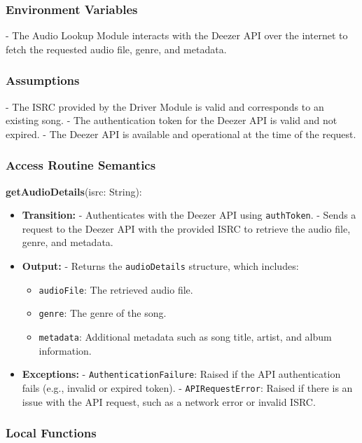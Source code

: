 \documentclass[12pt, titlepage]{article}
\begin{document}
\subsubsection{Environment Variables}
- The Audio Lookup Module interacts with the Deezer API over the internet to fetch the requested audio file, genre, and metadata.

\subsubsection{Assumptions}
- The ISRC provided by the Driver Module is valid and corresponds to an existing song.
- The authentication token for the Deezer API is valid and not expired.
- The Deezer API is available and operational at the time of the request.

\subsubsection{Access Routine Semantics}

\noindent \textbf{getAudioDetails}(isrc: String):
\begin{itemize}
\item \textbf{Transition:} 
    - Authenticates with the Deezer API using \texttt{authToken}.
    - Sends a request to the Deezer API with the provided ISRC to retrieve the audio file, genre, and metadata.
\item \textbf{Output:} 
    - Returns the \texttt{audioDetails} structure, which includes:
      \begin{itemize}
        \item \texttt{audioFile}: The retrieved audio file.
        \item \texttt{genre}: The genre of the song.
        \item \texttt{metadata}: Additional metadata such as song title, artist, and album information.
      \end{itemize}
\item \textbf{Exceptions:} 
    - \texttt{AuthenticationFailure}: Raised if the API authentication fails (e.g., invalid or expired token).
    - \texttt{APIRequestError}: Raised if there is an issue with the API request, such as a network error or invalid ISRC.
\end{itemize}

\subsubsection{Local Functions}
\end{document}
